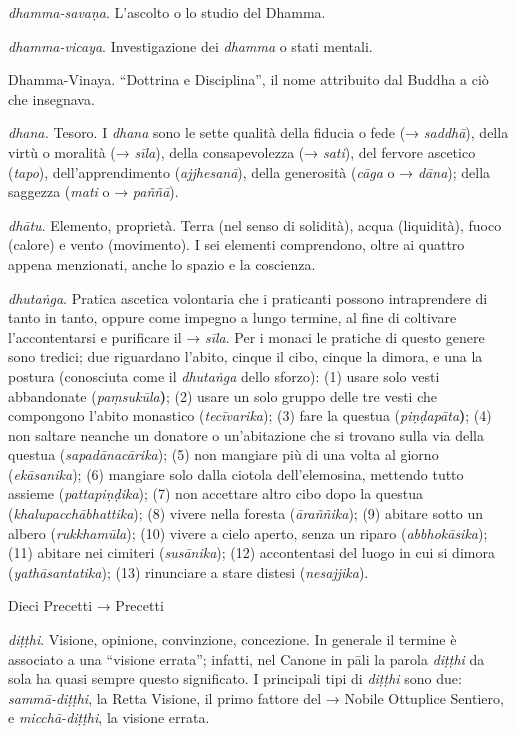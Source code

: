 \emph{dhamma-savaṇa}. L'ascolto o lo studio del Dhamma.

\emph{dhamma-vicaya}. Investigazione dei \emph{dhamma} o stati mentali.

Dhamma-Vinaya. ``Dottrina e Disciplina'', il nome attribuito dal Buddha
a ciò che insegnava.

\emph{dhana.} Tesoro. I \emph{dhana} sono le sette qualità della fiducia
o fede (→ \emph{saddhā}), della virtù o moralità (→ \emph{sīla}), della
consapevolezza (→ \emph{sati}), del fervore ascetico (\emph{tapo}),
dell'apprendimento (\emph{ajjhesanā}), della generosità (\emph{cāga} o →
\emph{dāna}); della saggezza (\emph{mati} o → \emph{paññā}).

\emph{dhātu}. Elemento, proprietà. Terra (nel senso di solidità), acqua
(liquidità), fuoco (calore) e vento (movimento). I sei elementi
comprendono, oltre ai quattro appena menzionati, anche lo spazio e la
coscienza.

\emph{dhutaṅga}. Pratica ascetica volontaria che i praticanti possono
intraprendere di tanto in tanto, oppure come impegno a lungo termine, al
fine di coltivare l'accontentarsi e purificare il → \emph{sīla}. Per i
monaci le pratiche di questo genere sono tredici; due riguardano
l'abito, cinque il cibo, cinque la dimora, e una la postura (conosciuta
come il \emph{dhutaṅga} dello sforzo): (1) usare solo vesti abbandonate
(\emph{paṃsukūla}\textbf{)}; (2) usare un solo gruppo delle tre vesti
che compongono l'abito monastico (\emph{tecīvarika}); (3) fare la
questua (\emph{piṇḍapāta}\textbf{)}; (4) non saltare neanche un donatore
o un'abitazione che si trovano sulla via della questua
(\emph{sapadānacārika}); (5) non mangiare più di una volta al giorno
(\emph{ekāsanika}); (6) mangiare solo dalla ciotola dell'elemosina,
mettendo tutto assieme (\emph{pattapiṇḍika}); (7) non accettare altro
cibo dopo la questua (\emph{khalupacchābhattika}); (8) vivere nella
foresta (\emph{āraññika}); (9) abitare sotto un albero
(\emph{rukkhamūla}); (10) vivere a cielo aperto, senza un riparo
(\emph{abbhokāsika}); (11) abitare nei cimiteri (\emph{susānika}); (12)
accontentasi del luogo in cui si dimora (\emph{yathāsantatika}); (13)
rinunciare a stare distesi (\emph{nesajjika}).

Dieci Precetti → Precetti

\emph{diṭṭhi}. Visione, opinione, convinzione, concezione. In generale
il termine è associato a una ``visione errata''; infatti, nel Canone in
pāli la parola \emph{diṭṭhi} da sola ha quasi sempre questo significato.
I principali tipi di \emph{diṭṭhi} sono due: \emph{sammā-diṭṭhi}, la
Retta Visione, il primo fattore del → Nobile Ottuplice Sentiero, e
\emph{micchā-diṭṭhi}, la visione errata.

